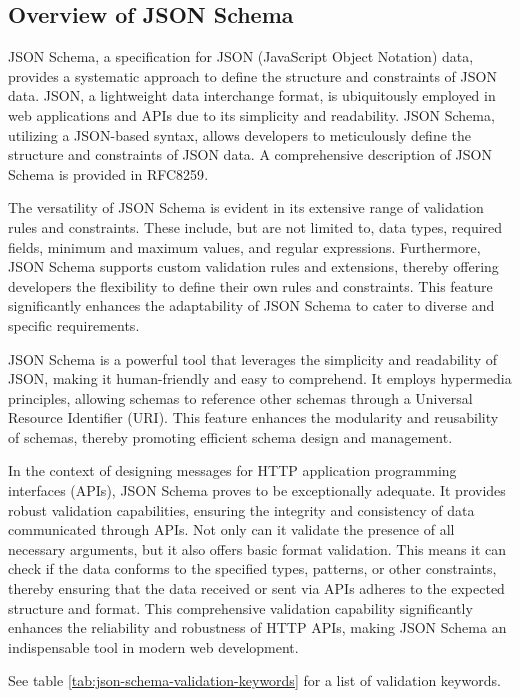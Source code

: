 \subsection{Overview of JSON Schema}

JSON Schema, a specification for JSON (JavaScript Object Notation) data, provides a systematic approach to define the structure and constraints of JSON data. JSON, a lightweight data interchange format, is ubiquitously employed in web applications and APIs due to its simplicity and readability. JSON Schema, utilizing a JSON-based syntax, allows developers to meticulously define the structure and constraints of JSON data. A comprehensive description of JSON Schema is provided in RFC8259\cite{RFC8259}.

The versatility of JSON Schema is evident in its extensive range of validation rules and constraints. These include, but are not limited to, data types, required fields, minimum and maximum values, and regular expressions. Furthermore, JSON Schema supports custom validation rules and extensions, thereby offering developers the flexibility to define their own rules and constraints. This feature significantly enhances the adaptability of JSON Schema to cater to diverse and specific requirements.

JSON Schema is a powerful tool that leverages the simplicity and readability of JSON, making it human-friendly and easy to comprehend. It employs hypermedia principles, allowing schemas to reference other schemas through a Universal Resource Identifier (URI). This feature enhances the modularity and reusability of schemas, thereby promoting efficient schema design and management.

In the context of designing messages for HTTP application programming interfaces (APIs), JSON Schema proves to be exceptionally adequate. It provides robust validation capabilities, ensuring the integrity and consistency of data communicated through APIs. Not only can it validate the presence of all necessary arguments, but it also offers basic format validation. This means it can check if the data conforms to the specified types, patterns, or other constraints, thereby ensuring that the data received or sent via APIs adheres to the expected structure and format. This comprehensive validation capability significantly enhances the reliability and robustness of HTTP APIs, making JSON Schema an indispensable tool in modern web development.

See table \ref{tab:json-schema-validation-keywords} for a list of validation keywords.

